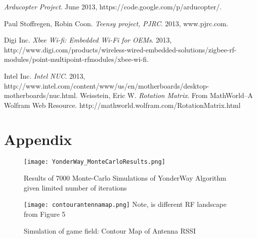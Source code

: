 \documentclass[11pt,letterpaper,titlepage]{article}
\begin{document}
\pagebreak
\begin{thebibliography}{9}

  \emph{Arducopter Project}.
  June 2013,
  https://code.google.com/p/arducopter/.

  Paul Stoffregen, Robin Coon.
  \emph{Teensy project, PJRC}.
  2013,
  www.pjrc.com.
  
  Digi Inc.
  \emph{Xbee Wi-fi: Embedded Wi-Fi for OEMs}.
  2013, 
  http://www.digi.com/products/wireless-wired-embedded-solutions/zigbee-rf-modules/point-multipoint-rfmodules/xbee-wi-fi.
  
	Intel Inc.
	\emph{Intel NUC}.
	2013,
	http://www.intel.com/content/www/us/en/motherboards/desktop-motherboards/nuc.html.
	Weisstein, Eric W. \emph{Rotation Matrix}.
	From MathWorld--A 	Wolfram Web Resource. http://mathworld.wolfram.com/RotationMatrix.html
\end{thebibliography}

\section{Appendix}


\begin{wrapfigure}{l}{0.95\textwidth}
\caption{Results of 7000 Monte-Carlo Simulations of YonderWay Algorithm given limited number of iterations}
\centering
\texttt{[image: YonderWay\_MonteCarloResults.png]}
\end{wrapfigure}

\begin{wrapfigure}{l}{0.95\textwidth}
\caption{Simulation of game field: Contour Map of Antenna RSSI}
\centering
\texttt{[image: contourantennamap.png]}
Note, is different RF landscape from Figure 5
\end{wrapfigure}


%
%
%  
\end{document}
